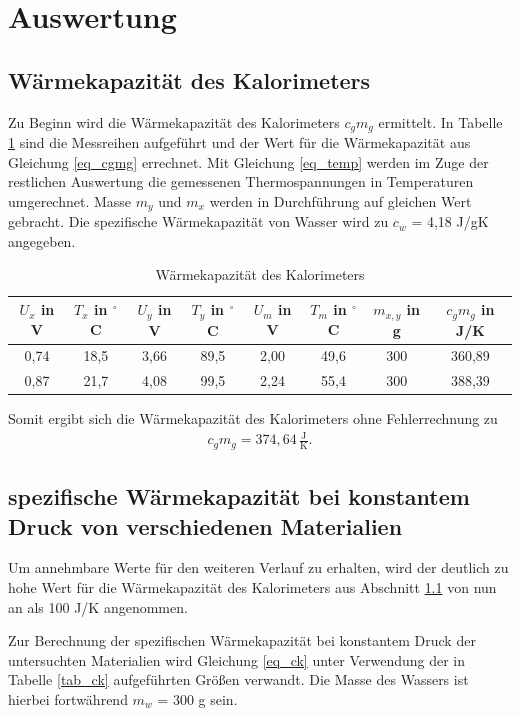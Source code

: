 \section{Auswertung}
\subsection{Wärmekapazität des Kalorimeters}
\label{sec_kalorimeter}
Zu Beginn wird die Wärmekapazität des Kalorimeters $c_g m_g$ ermittelt. In Tabelle \ref{tab_cgmg} sind die Messreihen aufgeführt und der
Wert für die Wärmekapazität aus Gleichung \eqref{eq_cgmg} errechnet. Mit Gleichung \eqref{eq_temp} werden im Zuge der restlichen 
Auswertung die gemessenen Thermospannungen in Temperaturen umgerechnet. Masse $m_y$ und $m_x$ werden in Durchführung auf gleichen Wert
gebracht. Die spezifische Wärmekapazität von Wasser wird zu $c_w$ = 4,18 J/gK angegeben.
\begin{table}[H]
 \begin{tabular}{c|c|c|c|c|c|c|c}
 $U_x$ in V & $T_x$ in $^\circ$C & $U_y$ in V & $T_y$ in $^\circ$C & $U_m$ in V & $T_m$ in $^\circ$C & $m_{x,y}$ in g & $c_g m_g$ in J/K\\
 \hline
0,74&	18,5&	3,66&	89,5&	2,00&	49,6&	300&	360,89\\
0,87&	21,7&	4,08&	99,5&	2,24&	55,4&	300&	388,39\\
 \end{tabular}
\caption{Wärmekapazität des Kalorimeters}
\label{tab_cgmg}
\end{table}
Somit ergibt sich die Wärmekapazität des Kalorimeters ohne Fehlerrechnung zu 
\begin{align}
c_g m_g = 374,64 \, \frac{\text{J}}{\text{K}}.
\end{align}

\subsection[spezifische Wärmekapazität verschiedener Materialien]{spezifische Wärmekapazität bei konstantem Druck von verschiedenen Materialien}
Um annehmbare Werte für den weiteren Verlauf zu erhalten, wird der deutlich zu hohe Wert für die Wärmekapazität des Kalorimeters aus Abschnitt
\ref{sec_kalorimeter} von nun an als 100 J/K angenommen. 

Zur Berechnung der spezifischen Wärmekapazität bei konstantem Druck der untersuchten Materialien wird Gleichung \eqref{eq_ck} unter Verwendung der in Tabelle
\ref{tab_ck} aufgeführten Größen verwandt. Die Masse des Wassers ist hierbei fortwährend $m_w$ = 300 g sein.

